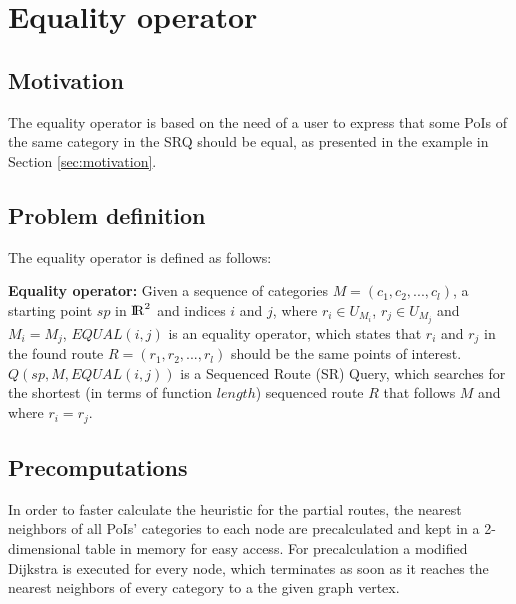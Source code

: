 


\section{Equality operator}
\label{ch:EO}

\subsection{Motivation} 
The equality operator is based on the need of a user to express that some PoIs of the same category in the SRQ should be equal, as presented in the example in Section \ref{sec:motivation}.

\subsection{Problem definition} 
\label{sec:problemEO}
The equality operator is defined as follows:

\textbf{Equality operator:} Given a sequence of categories $M = (c_1, c_2, ..., c_l)$, a starting point $sp$ in ${\rm I\!R}^2$ and indices $i$ and $j$, where $r_i \in U_{M_{i}}$, $r_j \in U_{M_{j}}$ and $M_i = M_j$, $EQUAL(i, j)$ is an equality operator, which states that $r_i$ and $r_j$ in the found route $R = (r_1, r_2, ..., r_l)$ should be the same points of interest.
$Q(sp, M, EQUAL(i, j))$ is a Sequenced Route (SR) Query, which searches for the shortest (in terms of function $length$) sequenced route $R$ that follows $M$ and where $r_i = r_j$.

\subsection{Precomputations} 
\label{sec:precompEO}
In order to faster calculate the heuristic for the partial routes, the nearest neighbors of all PoIs' categories to each node are precalculated and kept in a 2-dimensional table in memory for easy access. For precalculation a modified Dijkstra is executed for every node, which terminates as soon as it reaches the nearest neighbors of every category to a the given graph vertex.

